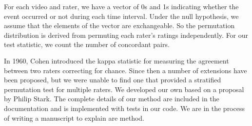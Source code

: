For each video and rater, we have a vector of 0s and 1s indicating whether the
event occurred or not during each time interval.  Under the null hypothesis, we
assume that the elements of the vector are exchangeable.  So the permutation
distribution is derived from permuting each rater's ratings independently.  For
our test statistic, we count the number of concordant pairs.

In 1960, Cohen \cite{cohen1960} introduced the kappa statistic for measuring
the agreement between two raters correcting for chance.  Since then a number of
extensions have been proposed, but we were unable to find one that provided a
stratified permutation test for multiple raters. We developed our own based
on a proposal by Philip Stark. The complete details of our method are included
in the documentation and is implemented with tests in our code.  We are in the
process of writing a manuscript to explain are method.


%


